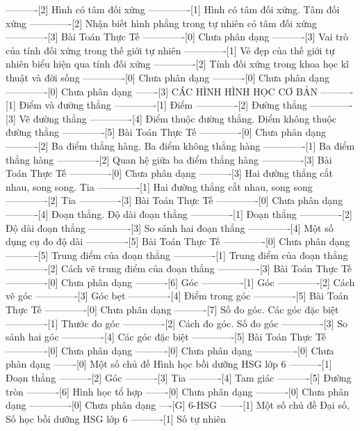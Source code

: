 ----------[2] Hình có tâm đối xứng
-------------[1] Hình có tâm đối xứng. Tâm đối xứng
-------------[2] Nhận biết hình phẳng trong tự nhiên có tâm đối xứng
-------------[3] Bài Toán Thực Tế
-------------[0] Chưa phân dạng
----------[3] Vai trò của tính đối xứng trong thế giới tự nhiên
-------------[1] Vẻ đẹp của thế giới tự nhiên biểu hiện qua tính đối xứng
-------------[2] Tính đối xứng trong khoa học kĩ thuật và đời sống
-------------[0] Chưa phân dạng
----------[0] Chưa phân dạng
-------------[0] Chưa phân dạng
-------[3] CÁC HÌNH HÌNH HỌC CƠ BẢN
----------[1] Điểm và đường thẳng
-------------[1] Điểm
-------------[2] Đường thẳng
-------------[3] Vẽ đường thẳng
-------------[4] Điểm thuộc đường thẳng. Điểm không thuộc đường thẳng
-------------[5] Bài Toán Thực Tế
-------------[0] Chưa phân dạng
----------[2] Ba điểm thẳng hàng. Ba điểm không thẳng hàng
-------------[1] Ba điểm thẳng hàng
-------------[2] Quan hệ giữa ba điểm thẳng hàng
-------------[3] Bài Toán Thực Tế
-------------[0] Chưa phân dạng
----------[3] Hai đường thẳng cắt nhau, song song. Tia
-------------[1] Hai đường thẳng cắt nhau, song song
-------------[2] Tia
-------------[3] Bài Toán Thực Tế
-------------[0] Chưa phân dạng
----------[4] Đoạn thẳng. Độ dài đoạn thẳng
-------------[1] Đoạn thẳng
-------------[2] Độ dài đoạn thẳng
-------------[3] So sánh hai đoạn thẳng
-------------[4] Một số dụng cụ đo độ dài
-------------[5] Bài Toán Thực Tế
-------------[0] Chưa phân dạng
----------[5] Trung điểm của đoạn thẳng
-------------[1] Trung điểm của đoạn thẳng
-------------[2] Cách vẽ trung điểm của đoạn thẳng
-------------[3] Bài Toán Thực Tế
-------------[0] Chưa phân dạng
----------[6] Góc
-------------[1] Góc
-------------[2] Cách vẽ góc
-------------[3] Góc bẹt
-------------[4] Điểm trong góc
-------------[5] Bài Toán Thực Tế
-------------[0] Chưa phân dạng
----------[7] Số đo góc. Các góc đặc biệt
-------------[1] Thước đo góc
-------------[2] Cách đo góc. Số đo góc
-------------[3] So sánh hai góc
-------------[4] Các góc đặc biệt
-------------[5] Bài Toán Thực Tế
-------------[0] Chưa phân dạng
----------[0] Chưa phân dạng
-------------[0] Chưa phân dạng
-------[0] Một số chủ đề Hình học bồi dưỡng HSG lớp 6
----------[1] Đoạn thẳng
----------[2] Góc
----------[3] Tia
----------[4] Tam giác
----------[5] Đường tròn
----------[6] Hình học tổ hợp
-------[0] Chưa phân dạng
----------[0] Chưa phân dạng
-------------[0] Chưa phân dạng
----[G] 6-HSG
-------[1] Một số chủ đề Đại số, Số học bồi dưỡng HSG lớp 6
----------[1] Số tự nhiên
